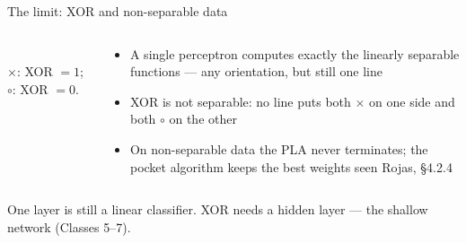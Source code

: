 \documentclass[aspectratio=169, 11pt]{beamer}
\newcommand{\figsource}[1]{{\scriptsize\color{mcMuted} #1}}
\newcommand{\src}[3]{}      %
\begin{document}
\begin{frame}{The limit: XOR and non-separable data}
  \src{rojas1996}{section}{3.2.2}
  \src{rojas1996}{section}{3.3.1}
  \src{rojas1996}{section}{4.2.4}
  \begin{columns}[T, onlytextwidth]
    \begin{column}{0.4\textwidth}
      \centering
      \\[0.1em]
      \figsource{$\bm\times$: XOR $=1$; \; $\circ$: XOR $=0$.}
    \end{column}
    \hfill
    \begin{column}{0.55\textwidth}
      \begin{itemize}\setlength{\itemsep}{1pt}
        \item A single perceptron computes exactly the
              \alert{linearly separable} functions --- any
              orientation, but still one line
        \item \alert{XOR} is not separable: no line puts both
              $\times$ on one side and both $\circ$ on the
              other
        \item On non-separable data the PLA \alert{never
              terminates}; the \alert{pocket algorithm} keeps
              the best weights seen
              \hfill{\scriptsize Rojas, \S4.2.4}
      \end{itemize}
    \end{column}
  \end{columns}
  \begin{redhighlight}
    One layer is still a linear classifier. XOR needs a
    \alert{hidden layer} --- the shallow network (Classes
    5--7).
  \end{redhighlight}
\end{frame}
\end{document}
